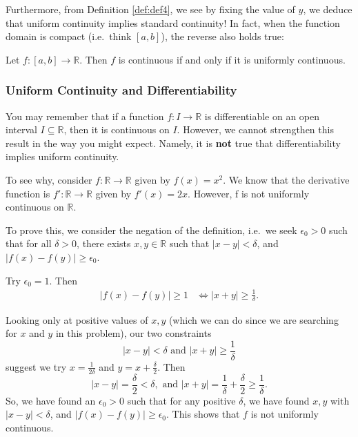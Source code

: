 \documentclass[
  12pt,
  a4paper]{extarticle}
\theoremstyle{plain}
\theoremstyle{definition}
\theoremstyle{plain}
\theoremstyle{plain}
\theoremstyle{plain}
\theoremstyle{plain}
\theoremstyle{definition}
\theoremstyle{definition}
\theoremstyle{remark}
\theoremstyle{remark}
\let\BeginKnitrBlock\begin \let\EndKnitrBlock\end
\renewcommand{\;}{\,}
\begin{document}
Furthermore, from Definition \ref{def:def4}, we see by fixing the value of \(y\), we deduce that uniform continuity implies standard continuity! In fact, when the function domain is compact (i.e.~think \([a,b]\)), the reverse also holds true:

\BeginKnitrBlock{proposition}
{\label{prp:prop2} }Let \(f:[a,b] \to \mathbb{R}\). Then \(f\) is continuous if and only if it is uniformly continuous.
\EndKnitrBlock{proposition}

\hypertarget{uniform-continuity-and-differentiability}{%
\subsubsection{Uniform Continuity and Differentiability}\label{uniform-continuity-and-differentiability}}

You may remember that if a function \(f:I \to \mathbb{R}\) is differentiable on an open interval \(I \subseteq \mathbb{R}\), then it is continuous on \(I\). However, we cannot strengthen this result in the way you might expect. Namely, it is \textbf{not} true that differentiability implies uniform continuity.

\BeginKnitrBlock{example}
{\label{exm:ex1} }To see why, consider \(f:\mathbb{R} \to \mathbb{R}\) given by \(f(x) = x^2\). We know that the derivative function is \(f':\mathbb{R} \to \mathbb{R}\) given by \(f'(x) = 2x.\) However, f is not uniformly continuous on \(\mathbb{R}\).

To prove this, we consider the negation of the definition, i.e.~we seek \(\epsilon_0 >0\) such that for all \(\delta > 0\), there exists \(x,y \in \mathbb{R}\) such that \(\lvert x - y \rvert < \delta\), and \(\lvert f(x) - f(y) \rvert \geq \epsilon_0.\)

Try \(\epsilon_0 = 1.\) Then
\begin{align*}
\lvert f(x) - f(y) \rvert \geq 1 &\Leftrightarrow \lvert x + y \rvert \geq \frac{1}{\delta}.
\end{align*}

Looking only at positive values of \(x,y\) (which we can do since we are searching for \(x\) and \(y\) in this problem), our two constraints \[\lvert x - y \rvert < \delta \;\; \text{and} \;\; \lvert x + y \rvert \geq \frac{1}{\delta}\] suggest we try \(x = \frac{1}{2\delta}\) and \(y = x + \frac{\delta}{2}.\) Then \[\lvert x - y \rvert = \frac{\delta}{2} < \delta, \;\; \text{and} \;\; \lvert x + y \rvert = \frac{1}{\delta} + \frac{\delta}{2} \geq \frac{1}{\delta}.\] So, we have found an \(\epsilon_0>0\) such that for any positive \(\delta\), we have found \(x,y\) with \(\lvert x - y \rvert < \delta\), and \(\lvert f(x) - f(y) \rvert \geq \epsilon_0.\) This shows that \(f\) is not uniformly continuous.
\EndKnitrBlock{example}
\end{document}
